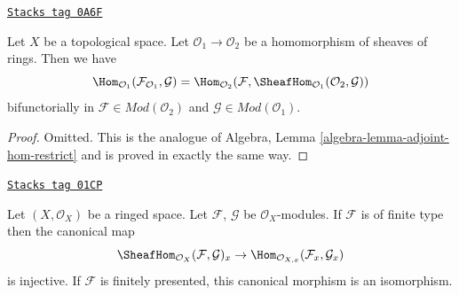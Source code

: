 \begin{lemma}
\label{modules-lemma-adjoint-tensor-restrict}
\href{https://stacks.math.columbia.edu/tag/0A6F}{\texttt{Stacks tag 0A6F}}

Let $X$ be a topological space. Let $\mathcal{O}_1 \to \mathcal{O}_2$
be a homomorphism of sheaves of rings. Then we have
$$
\Hom_{\mathcal{O}_1}(\mathcal{F}_{\mathcal{O}_1}, \mathcal{G}) =
\Hom_{\mathcal{O}_2}(\mathcal{F},
\SheafHom_{\mathcal{O}_1}(\mathcal{O}_2, \mathcal{G}))
$$
bifunctorially in $\mathcal{F} \in \textit{Mod}(\mathcal{O}_2)$
and $\mathcal{G} \in \textit{Mod}(\mathcal{O}_1)$.
\end{lemma}

\begin{proof}
Omitted. This is the analogue of
Algebra, Lemma \ref{algebra-lemma-adjoint-hom-restrict}
and is proved in exactly the same way.
\end{proof}

\begin{lemma}
\label{modules-lemma-stalk-internal-hom}
\href{https://stacks.math.columbia.edu/tag/01CP}{\texttt{Stacks tag 01CP}}

Let $(X, \mathcal{O}_X)$ be a ringed space.
Let $\mathcal{F}$, $\mathcal{G}$ be $\mathcal{O}_X$-modules.
If $\mathcal{F}$ is of finite type then the canonical map
$$
\SheafHom_{\mathcal{O}_X}(\mathcal{F}, \mathcal{G})_x
\to
\Hom_{\mathcal{O}_{X, x}}(\mathcal{F}_x, \mathcal{G}_x)
$$
is injective.
If $\mathcal{F}$ is finitely presented,
this canonical morphism is an isomorphism.
\end{lemma}

